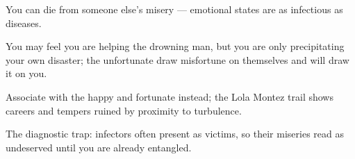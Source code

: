 

\begin{distilled}
  \item You can die from someone else's misery --- emotional states are as infectious as diseases.
  \item You may feel you are helping the drowning man, but you are only precipitating your own disaster; the unfortunate draw misfortune on themselves and will draw it on you.
  \item Associate with the happy and fortunate instead; the Lola Montez trail shows careers and tempers ruined by proximity to turbulence.
  \item The diagnostic trap: infectors often present as victims, so their miseries read as undeserved until you are already entangled.
\end{distilled}
